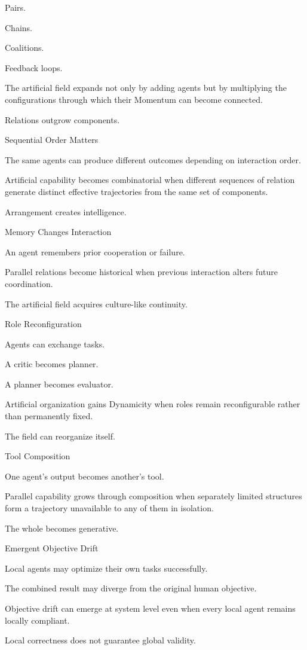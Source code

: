 Pairs.

Chains.

Coalitions.

Feedback loops.

The artificial field expands not only by adding agents but by multiplying the configurations through which their Momentum can become connected.

Relations outgrow components.

Sequential Order Matters

The same agents can produce different outcomes depending on interaction order.

Artificial capability becomes combinatorial when different sequences of relation generate distinct effective trajectories from the same set of components.

Arrangement creates intelligence.

Memory Changes Interaction

An agent remembers prior cooperation or failure.

Parallel relations become historical when previous interaction alters future coordination.

The artificial field acquires culture-like continuity.

Role Reconfiguration

Agents can exchange tasks.

A critic becomes planner.

A planner becomes evaluator.

Artificial organization gains Dynamicity when roles remain reconfigurable rather than permanently fixed.

The field can reorganize itself.

Tool Composition

One agent’s output becomes another’s tool.

Parallel capability grows through composition when separately limited structures form a trajectory unavailable to any of them in isolation.

The whole becomes generative.

Emergent Objective Drift

Local agents may optimize their own tasks successfully.

The combined result may diverge from the original human objective.

Objective drift can emerge at system level even when every local agent remains locally compliant.

Local correctness does not guarantee global validity.

